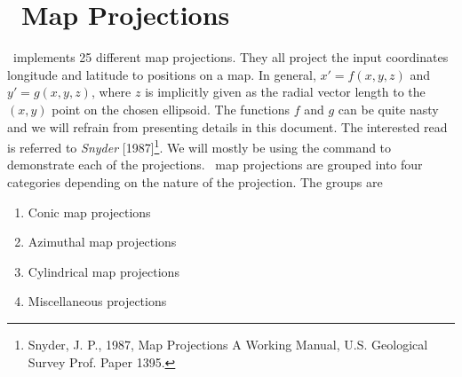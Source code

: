 %
%
\chapter{\gmt\ Map Projections}

\GMT\ implements 25 different map projections.  They all project the input coordinates
longitude and latitude to positions on a map.  In general, $x' = f(x,y,z)$ and $y' = g(x,y,z)$, where
$z$ is implicitly given as the radial vector length to the $(x,y)$ point on the chosen ellipsoid.  The functions $f$ and $g$ can be
quite nasty and we will refrain from presenting details in this document.  The interested read is referred to
{\it Snyder} [1987]\footnote{Snyder, J. P., 1987, Map Projections \- A Working Manual, U.S. Geological Survey Prof. Paper 1395.}.
We will mostly be using the  command to demonstrate each of the projections.
\GMT\ map projections are grouped into four categories depending on the
nature of the projection.  The groups are

\begin{enumerate}
\item Conic map projections
\item Azimuthal map projections
\item Cylindrical map projections
\item Miscellaneous projections
\end{enumerate}





